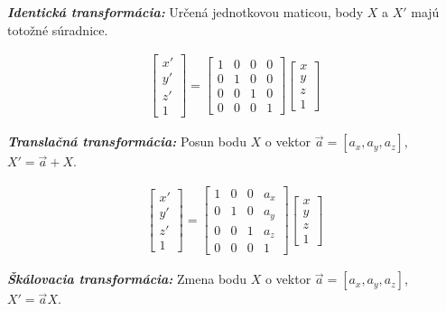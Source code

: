 \textbf{\textit{Identická transformácia:}} Určená jednotkovou maticou, body $X$ a $X'$ majú totožné súradnice. 

\begin{equation}
\label{eq_kalib_ident}
\begin{aligned}
\begin{bmatrix}
x' \\ y' \\ z' \\ 1
\end{bmatrix}=
\begin{bmatrix}
1 & 0 & 0 & 0 \\
0 & 1 & 0 & 0 \\
0 & 0 & 1 & 0 \\
0 & 0 & 0 & 1 
\end{bmatrix}
\begin{bmatrix}
x \\ y \\ z \\ 1 
\end{bmatrix}
\end{aligned}
\end{equation}

\textbf{\textit{Translačná transformácia:}} Posun bodu $X$ o vektor $\vec{a}=\left[a_x,a_y,a_z\right]$, $X'= \vec{a} + X$.

\begin{equation}
\label{eq_kalib_translat}
\begin{aligned}
\begin{bmatrix}
x' \\ y' \\ z' \\ 1 
\end{bmatrix}
=
\begin{bmatrix}
1 & 0 & 0 & a_x \\
0 & 1 & 0 & a_y \\
0 & 0 & 1 & a_z \\
0 & 0 & 0 & 1 
\end{bmatrix}
\begin{bmatrix}
x \\ y \\ z \\ 1 
\end{bmatrix}
\end{aligned}
\end{equation}


\textbf{\textit{Škálovacia transformácia:}} Zmena  bodu $X$ o vektor $\vec{a}=\left[a_x,a_y,a_z\right]$, $X'= \vec{a}X$.

